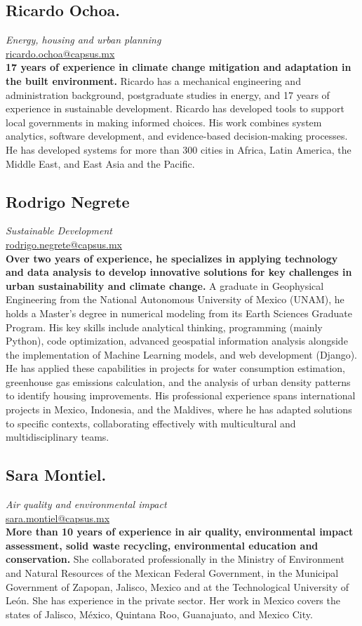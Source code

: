 \documentclass[
	a4paper,
	12pt,
	unnumberedsections,
]{CSSullivanBusinessReport}
\begin{document}
\subsection*{Ricardo Ochoa.}
\textit{Energy, housing and urban planning} \\
\href{mailto:ricardo.ochoa@capsus.mx}{ricardo.ochoa@capsus.mx} \\[0.5em]
\textbf{17 years of experience in climate change mitigation and adaptation in the built environment.} Ricardo has a mechanical engineering and administration background, postgraduate studies in energy, and 17 years of experience in sustainable development. Ricardo has developed tools to support local governments in making informed choices. His work combines system analytics, software development, and evidence-based decision-making processes. He has developed systems for more than 300 cities in Africa, Latin America, the Middle East, and East Asia and the Pacific.

\subsection*{Rodrigo Negrete}
\textit{Sustainable Development} \\
\href{mailto:rodrigo.negrete@capsus.mx}{rodrigo.negrete@capsus.mx} \\[0.5em]
\textbf{Over two years of experience, he specializes in applying technology and data analysis to develop innovative solutions for key challenges in urban sustainability and climate change.} A graduate in Geophysical Engineering from the National Autonomous University of Mexico (UNAM), he holds a Master's degree in numerical modeling from its Earth Sciences Graduate Program. His key skills include analytical thinking, programming (mainly Python), code optimization, advanced geospatial information analysis alongside the implementation of Machine Learning models, and web development (Django). He has applied these capabilities in projects for water consumption estimation, greenhouse gas emissions calculation, and the analysis of urban density patterns to identify housing improvements. His professional experience spans international projects in Mexico, Indonesia, and the Maldives, where he has adapted solutions to specific contexts, collaborating effectively with multicultural and multidisciplinary teams.

\subsection*{Sara Montiel.}
\textit{Air quality and environmental impact} \\
\href{mailto:sara.montiel@capsus.mx}{sara.montiel@capsus.mx} \\[0.5em]
\textbf{More than 10 years of experience in air quality, environmental impact assessment, solid waste recycling, environmental education and conservation.} She collaborated professionally in the Ministry of Environment and Natural Resources of the Mexican Federal Government, in the Municipal Government of Zapopan, Jalisco, Mexico and at the Technological University of León. She has experience in the private sector. Her work in Mexico covers the states of Jalisco, México, Quintana Roo, Guanajuato, and Mexico City.
\end{document}
